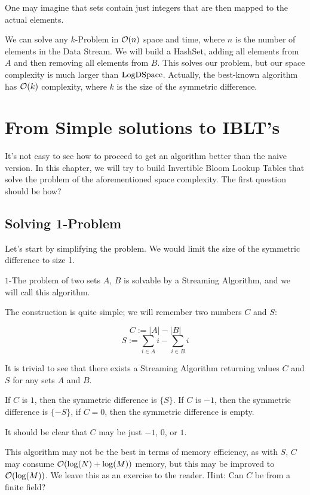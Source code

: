 One may imagine that sets contain just integers that are then mapped to the actual elements.

We can solve any \(k\)-Problem in \(\mathcal{O}(n)\) space and time, where \(n\) is the number of elements in the Data Stream. We will build a HashSet, adding all elements from \(A\) and then removing all elements from \(B\). This solves our problem, but our space complexity is much larger than \(\mathrm{LogDSpace}\). Actually, the best-known algorithm has \(\mathcal{O}(k)\) complexity, where \(k\) is the size of the symmetric difference.

\section{From Simple solutions to IBLT's}

It's not easy to see how to proceed to get an algorithm better than the naive version. In this chapter, we will try to build Invertible Bloom Lookup Tables that solve the problem of the aforementioned space complexity. The first question should be how?

\subsection{Solving 1-Problem}

Let's start by simplifying the problem. We would limit the size of the symmetric difference to size 1.

\begin{lemma}
\(1\)-The problem of two sets \(A\), \(B\) is solvable by a Streaming Algorithm, and we will call this algorithm.
\end{lemma}

The construction is quite simple; we will remember two numbers \(C\) and \(S\):

\[ C := |A| - |B| \]
\[ S := \sum_{i\in A} i - \sum_{i\in B} i \]

It is trivial to see that there exists a Streaming Algorithm returning values \(C\) and \(S\) for any sets \(A\) and \(B\).

If \(C\) is \(1\), then the symmetric difference is \(\{S\}\). If \(C\) is \(-1\), then the symmetric difference is \(\{-S\}\), if \(C = 0\), then the symmetric difference is empty.

It should be clear that \(C\) may be just \(-1\), \(0\), or \(1\).

This algorithm may not be the best in terms of memory efficiency, as with \(S\), \(C\) may consume \(\mathcal{O}(\log(N) + \log(M))\) memory, but this may be improved to \(\mathcal{O}(\log(M))\). We leave this as an exercise to the reader. Hint: Can \(C\) be from a finite field?

